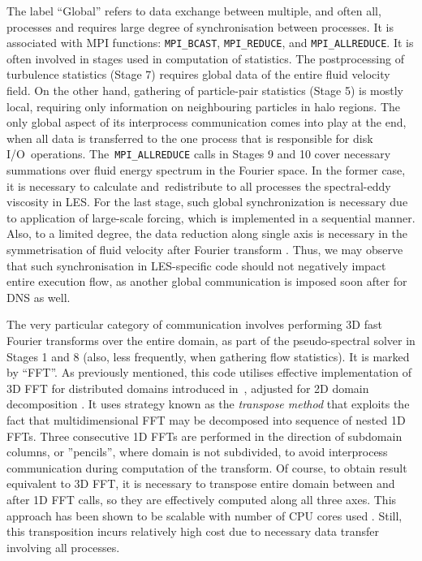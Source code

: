 \documentclass{pracamgren}
\begin{document}
The label ``Global'' refers to data exchange between multiple, and often all, processes and requires large degree of synchronisation between processes.
It is associated with MPI functions: \texttt{MPI\_BCAST}, \texttt{MPI\_REDUCE}, and \texttt{MPI\_ALLREDUCE}.
It is often involved in stages used in computation of statistics.
The postprocessing of turbulence statistics (Stage 7) requires global data of the entire fluid velocity field.
On the other hand, gathering of particle-pair statistics (Stage 5) is mostly local, requiring only information on neighbouring particles in halo regions.
The only global aspect of its interprocess communication comes into play at the end, when all data is transferred to the one process that is responsible for disk I/O~operations.
The~\texttt{MPI\_ALLREDUCE} calls in Stages 9 and 10 cover necessary summations over fluid energy spectrum in the Fourier space.
In the former case, it is necessary to calculate and~redistribute to all processes the spectral-eddy viscosity in LES.
For the last stage, such global synchronization is necessary due to application of large-scale forcing, which is implemented in a sequential manner.
Also, to a limited degree, the data reduction along single axis is necessary in the symmetrisation of fluid velocity after Fourier transform \parencite{Ayala2014}. 
Thus, we may observe that such synchronisation in LES-specific code should not negatively impact entire execution flow, as another global communication is imposed soon after for DNS as well. 

The very particular category of communication involves performing 3D fast Fourier transforms over the entire domain, as part of the pseudo-spectral solver in Stages 1 and 8 (also, less frequently, when gathering flow statistics).
It is marked by ``FFT''.
As previously mentioned, this code utilises effective implementation of 3D FFT for distributed domains introduced in~\textcite{Dmitruk2001}, adjusted for 2D domain decomposition \parencite{Ayala2013}.
It uses strategy known as the \emph{transpose method} that exploits the fact that multidimensional FFT may be decomposed into sequence of nested 1D FFTs.
Three consecutive 1D FFTs are performed in the direction of subdomain columns, or ''pencils'', where domain is not subdivided, to avoid interprocess communication during computation of the transform.
Of course, to obtain result equivalent to 3D FFT, it is necessary to transpose entire domain between and after 1D FFT calls, so they are effectively computed along all three axes.
This approach has been shown to be scalable with number of CPU cores used \parencite{Dmitruk2001,Ayala2013}.
Still, this transposition incurs relatively high cost due to necessary data transfer involving all processes.
\end{document}
